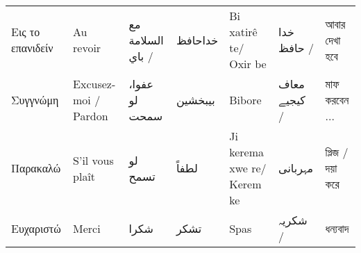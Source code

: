 \begin{longtable}{p{3.5cm} p{3.5cm} p{3.5cm} p{3.5cm} p{3.5cm} p{3.5cm} p{3.5cm} }
 Εις το επανιδείν                                                                                                              & Au revoir                                                                                       & مع السلامة /  باي                                                                     & خداحافظ                                                     & Bi xatirê te/ Oxir be                                                              & خدا حافظ /                                                                     & আবার দেখা হবে                                                     \\
 Συγγνώμη                                                                                                                      & Excusez-moi / Pardon                                                                            & عفوا، لو سمحت                                                                         & بيبخشين                                                     & Bibore                                                                             & معاف کیجیے /                                                                   & মাফ করবেন ...                                                     \\
 Παρακαλώ                                                                                                                      & S'il vous plaît                                                                                 & لو تسمح                                                                               & لطفاً                                                       & Ji kerema xwe re/ Kerem ke                                                         & مہربانی                                                                        & প্লিজ / দয়া করে                                                   \\
 Ευχαριστώ                                                                                                                     & Merci                                                                                           & شکرا                                                                                  & تشكر                                                        & Spas                                                                               & شکریہ /                                                                        & ধন্যবাদ                                                           \\

\end{longtable}

